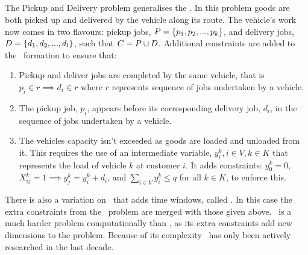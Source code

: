 \subsection{\PDP}

The Pickup and Delivery problem generalises the \VRP. In this problem goods are both picked up and delivered by the vehicle along its route. The vehicle's work now comes in two flavours: pickup jobs, $P = \{p_1,p_2,...,p_k\}$, and delivery jobs, $D = \{d_1,d_2,...,d_l\}$, such that $C = P \cup D$. Additional constraints are added to the \CVRP\ formation to ensure that:

\begin{enumerate}
   \item Pickup and deliver jobs are completed by the same vehicle, that is $p_i \in r \implies d_i \in r$ where $r$ represents sequence of jobs undertaken by a vehicle.

   \item The pickup job, $p_i$, appears before its corresponding delivery job, $d_i$, in the sequence of jobs undertaken by a vehicle.

   \item The vehicles capacity isn't exceeded as goods are loaded and unloaded from it. This requires the use of an intermediate variable, $y^k_i, i \in V, k \in K$ that represents the load of vehicle $k$ at customer $i$. It adds constraints: $y^k_0 = 0$, $X_{ij}^k = 1 \implies y^k_j = y^k_i + d_i$, and $\sum_{i \in V} y^k_i \leq q$ for all $k \in K$, to enforce this.
   
\end{enumerate}

There is also a variation on \PDP\ that adds time windows, called \PDPTW. In this case the extra constraints from the \VRPTW\ problem are merged with those given above. \PDP\ is a much harder problem computationally than \CVRP, as its extra constraints add new dimensions to the problem. Because of its complexity \PDP\ has only been actively researched in the last decade. 


